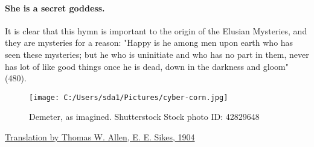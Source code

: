 \documentclass{article}
\begin{document}
\paragraph{She is a secret goddess.} It is clear that this hymn is important to the origin of the Elusian Mysteries, and they are mysteries for a reason: "Happy is he among men upon earth who has seen these mysteries; but he who is uninitiate and who has no part in them, never has lot of like good things once he is dead, down in the darkness and gloom" (480).

\begin{figure}
	\centering
	\texttt{[image: C:/Users/sda1/Pictures/cyber-corn.jpg]}
	\caption{Demeter, as imagined. Shutterstock Stock photo ID: 42829648}
\end{figure}

\href{http://data.perseus.org/citations/urn:cts:greekLit:tlg0013.tlg002.perseus-eng1:2}{Translation by Thomas W. Allen, E. E. Sikes, 1904}
\end{document}
